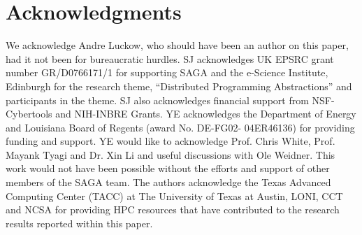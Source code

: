 \documentclass{sig-alternate}
\begin{document}




\section{Acknowledgments}
We acknowledge Andre Luckow, who should have been an author on this
paper, had it not been for bureaucratic hurdles.  SJ acknowledges UK
EPSRC grant number GR/D0766171/1 for supporting SAGA and the e-Science
Institute, Edinburgh for the research theme, ``Distributed Programming
Abstractions'' and participants in the theme. SJ also acknowledges
financial support from NSF-Cybertools and NIH-INBRE Grants. YE
acknowledges the Department of Energy and Louisiana Board of Regents
(award No. DE-FG02- 04ER46136) for providing funding and support. YE
would like to acknowledge Prof. Chris White, Prof. Mayank Tyagi and
Dr. Xin Li and useful discussions with Ole Weidner. This work would
not have been possible without the efforts and support of other
members of the SAGA team. The authors acknowledge the Texas Advanced
Computing Center (TACC) at The University of Texas at Austin, LONI, CCT and
NCSA for providing HPC resources that have contributed to the research
results reported within this paper.

 

\end{document}
